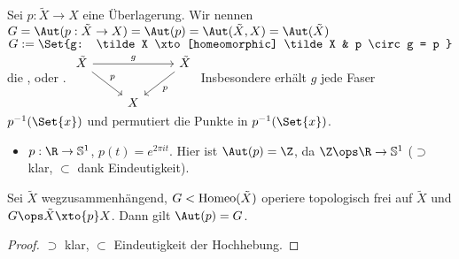 \begin{df}
    Sei $p: \tilde X \to X$ eine Überlagerung.
    Wir nennen $G = \Aut(p: \tilde X \to X) = \Aut(p) = \Aut(\tilde X, X) = \Aut(\tilde X)$
    \begin{math}
        G := \Set{g: \tilde X \xto[homeomorphic] \tilde X & p \circ g = p }
    \end{math}
    die ,  oder .
    \begin{math}
        \begin{tikzcd}
            \tilde X \ar[rr,"g"] \ar[rd,"p"] && \tilde X \ar[ld,"p"] \\
            & X &
        \end{tikzcd}
    \end{math}
    Insbesondere erhält $g$ jede Faser $p^{-1}(\Set{x})$ und permutiert die Punkte in $p^{-1}(\Set{x})$.
\end{df}

\begin{ex}
    \begin{itemize}
        \item
            $p: \R \to \S^1$, $p(t) = e^{2\pi i t}$.
            Hier ist $\Aut(p) = \Z$, da $\Z \ops \R \to \S^1$ ($\supset$ klar, $\subset$ dank Eindeutigkeit).
    \end{itemize}
\end{ex}

\begin{st}
    Sei $\tilde X$ wegzusammenhängend, $G < \operatorname{Homeo}(\tilde X)$ operiere topologisch frei auf $\tilde X$ und $G \ops \tilde X \xto{p} X$.
    Dann gilt $\Aut(p) = G$.
    \begin{proof}
        $\supset$ klar, $\subset$ Eindeutigkeit der Hochhebung.
    \end{proof}
\end{st}


